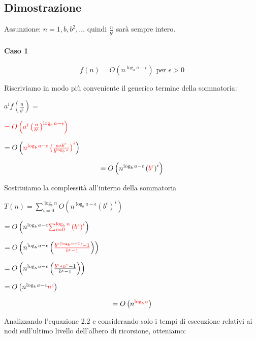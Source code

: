\subsection{Dimostrazione}

Assunzione: $n = 1, b,b^2,\ldots$ quindi $\frac{n}{b^i}$ sarà sempre intero.

\paragraph{Caso 1}

\begin{equation}
f(n) = O(n^{\log_b{a} - \epsilon}) \mbox{ per } \epsilon > 0
\end{equation}

Riscriviamo in modo più conveniente il generico termine della sommatoria:

$a^if\left(\frac{n}{b^i}\right)=$

$\textcolor{red}{=O\left(a^i\left(\frac{n}{b^i}\right)^{\log_b{a-\epsilon}}\right)}$

$= O\left(\textcolor{red}{n^{\log_b{a-\epsilon}}\left(\frac{a*b^\epsilon}{b^{\log_b{a}}}\right)^i}\right)$

\begin{equation}
= O\left(n^{\log_b{a-\epsilon}}\left(\textcolor{red}{b^\epsilon}\right)^i\right)
\end{equation}

Sostituiamo la complessità all'interno della sommatoria

$T(n) = \sum_{i=0}^{\log_b{n}}{O\left(n^{\log_b{a-\epsilon}}\left(b^\epsilon\right)^i\right)}$

$=O\left(n^{\log_b{a-\epsilon}}\textcolor{red}{\sum_{i=0}^{\log_b{n}}{(b^\epsilon)}^i}\right)$

$=O\left(n^{\log_b{a-\epsilon}}\left(\textcolor{red}{\frac{b^{\epsilon( \log_b{n}+1)}-1}{b^\epsilon-1}}\right)\right)$

$=O\left(n^{\log_b{a-\epsilon}}\left(\frac{\textcolor{red}{b^\epsilon * n^\epsilon} - 1}{b^\epsilon-1}\right)\right)$

$=O\left(n^{\log_b{a-\epsilon}}\textcolor{red}{n^\epsilon}\right)$

\begin{equation}
= O\left(n^{\textcolor{red}{\log_b{a}}}\right)
\end{equation}

Analizzando l’equazione 2.2 e considerando solo i tempi di esecuzione relativi ai nodi sull’ultimo livello dell’albero di ricorsione, otteniamo:

